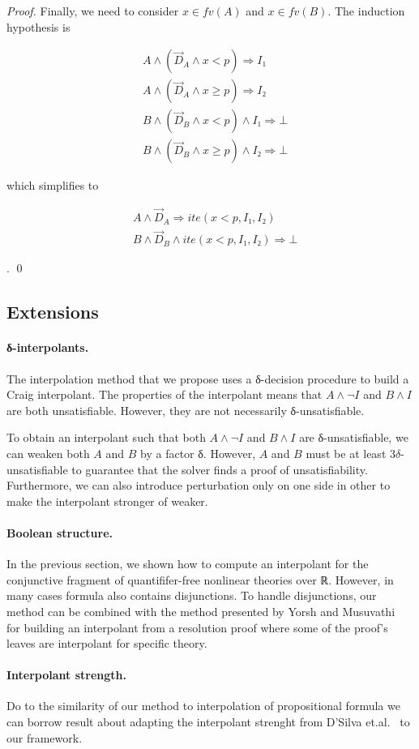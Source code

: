 \begin{proof}
Finally, we need to consider $x ∈ fv(A)$ and $x ∈ fv(B)$.
The induction hypothesis is\\
\parbox{0.38\linewidth}{
\begin{eqnarray*}
& A ∧ (\vec D_A ∧ x < p) ⇒ I₁ \\
& A ∧ (\vec D_A ∧ x ≥ p) ⇒ I₂ \\
& B ∧ (\vec D_B ∧ x < p) ∧ I₁ ⇒ ⊥ \\
& B ∧ (\vec D_B ∧ x ≥ p) ∧ I₂ ⇒ ⊥
\end{eqnarray*}
}
which simplifies to
\parbox{0.42\linewidth}{
\begin{eqnarray*}
& A ∧ \vec D_A ⇒ ite(x < p, I₁, I₂)\\
& B ∧ \vec D_B ∧ ite(x < p, I₁, I₂) ⇒ ⊥
\end{eqnarray*}
}.
\qed
\end{proof}


\subsection{Extensions}


\paragraph{δ-interpolants.}
The interpolation method that we propose uses a δ-decision procedure to build a Craig interpolant.
The properties of the interpolant means that $A ∧ ¬I$ and $B ∧ I$ are both unsatisfiable.
However, they are not necessarily δ-unsatisfiable.

To obtain an interpolant such that both $A ∧ ¬I$ and $B ∧ I$ are δ-unsatisfiable, we can weaken both $A$ and $B$ by a factor δ.
However, $A$ and $B$ must be at least $3δ$-unsatisfiable to guarantee that the solver finds a proof of unsatisfiability.
Furthermore, we can also introduce perturbation only on one side in other to make the interpolant stronger of weaker.

\paragraph{Boolean structure.}
In the previous section, we shown how to compute an interpolant for the conjunctive fragment of quantififer-free nonlinear theories over ℝ.
However, in many cases formula also contains disjunctions.
To handle disjunctions, our method can be combined with the method presented by Yorsh and Musuvathi~\cite{DBLP:conf/cade/YorshM05} for building an interpolant from a resolution proof where some of the proof's leaves are interpolant for specific theory.


\paragraph{Interpolant strength.}
Do to the similarity of our method to interpolation of propositional formula we can borrow result about adapting the interpolant strenght from D'Silva et.al.~\cite{DBLP:conf/vmcai/DSilvaKPW10} to our framework.
